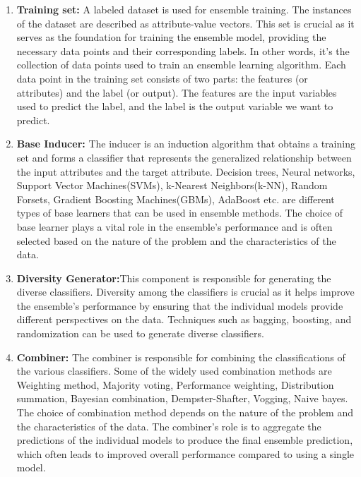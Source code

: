 \begin{enumerate}
    \item \textbf{Training set:} A labeled dataset is used for ensemble training. The instances of the dataset are described as attribute-value vectors. This set is crucial as it serves as the foundation for training the ensemble model, providing the necessary data points and their corresponding labels. In other words, it's the collection of data points used to train an ensemble learning algorithm. Each data point in the training set consists of two parts: the features (or attributes) and the label (or output). The features are the input variables used to predict the label, and the label is the output variable we want to predict.
    \item \textbf{Base Inducer:} The inducer is an induction algorithm that obtains a training set and forms a classifier that represents the generalized relationship between the input attributes and the target attribute. Decision trees, Neural networks, Support Vector Machines(SVMs), k-Nearest Neighbors(k-NN), Random Forsets, Gradient Boosting Machines(GBMs), AdaBoost etc. are different types of base learners that can be used in ensemble methods. The choice of base learner plays a vital role in the ensemble's performance and is often selected based on the nature of the problem and the characteristics of the data.
    \item \textbf{Diversity Generator:}This component is responsible for generating the diverse classifiers. Diversity among the classifiers is crucial as it helps improve the ensemble's performance by ensuring that the individual models provide different perspectives on the data. Techniques such as bagging, boosting, and randomization can be used to generate diverse classifiers.
    \item \textbf{Combiner:} The combiner is responsible for combining the classifications of the various classifiers. Some of the widely used combination methods are Weighting method, Majority voting, Performance weighting, Distribution summation, Bayesian combination, Dempster-Shafter, Vogging, Naive bayes. The choice of combination method depends on the nature of the problem and the characteristics of the data. The combiner's role is to aggregate the predictions of the individual models to produce the final ensemble prediction, which often leads to improved overall performance compared to using a single model.\cite{21} 
\end{enumerate}

